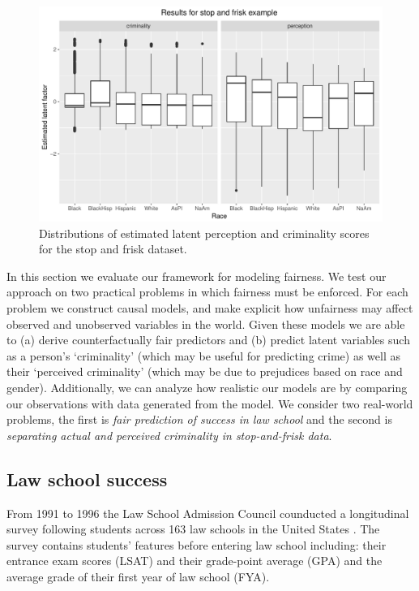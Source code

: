 
\begin{figure}[!th]
\begin{center}
\vspace{-1ex}
\centerline{\includegraphics[width=\columnwidth]{stopandfrisk_output.pdf}}
\vspace{-2ex}
\caption{Distributions of estimated latent perception and criminality scores for the stop and frisk dataset.\label{figure.stop_and_frisk_output}\vspace{-5ex}}
\vspace{-2ex}
\end{center}
\end{figure}

In this section we evaluate our framework for modeling fairness. We test our approach on two practical problems in which fairness must be enforced. For each problem we construct causal models, and make explicit how unfairness may affect observed and unobserved variables in the world. Given these models we are able to (a) derive counterfactually fair predictors and (b) predict latent variables such as a person's `criminality' (which may be useful for predicting crime) as well as their `perceived criminality' (which may be due to prejudices based on race and gender). Additionally, we can analyze how realistic our models are by comparing our observations with data generated from the model. We consider two real-world problems, the first is \emph{fair prediction of success in law school} and the second is \emph{separating actual and perceived criminality in stop-and-frisk data}.

\subsection{Law school success}
\label{sec:law-school-success}
From 1991 to 1996 the Law School Admission Council
counducted a longitudinal survey following students across 163 law
schools in the United States \cite{wightman1998lsac}. %
The survey contains students' features before entering law school
including: their entrance exam scores (LSAT) and their grade-point
average (GPA) and the average grade of their first year of law school
(FYA). %

